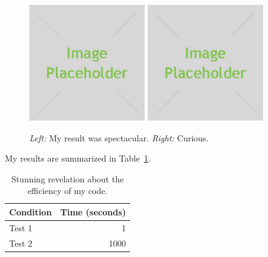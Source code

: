 \begin{figure}[h]
    \centering
    \includegraphics[width=5cm]{placeholder.jpg}
    \includegraphics[width=5cm]{placeholder.jpg}
    \caption{\emph{Left:} My result was spectacular. \emph{Right:} Curious.}
    \label{fig:result1}
\end{figure}

My results are summarized in Table~\ref{tab:table1}.

\begin{table}[h]
    \centering
    \begin{tabular}{lr}
        \toprule
        Condition & Time (seconds) \\
        \midrule
        Test 1 & 1 \\
        Test 2 & 1000 \\
        \bottomrule
    \end{tabular}
    \caption{Stunning revelation about the efficiency of my code.}
    \label{tab:table1}
\end{table}


